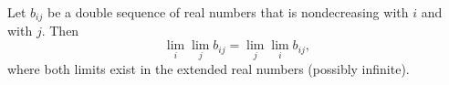 Let $b_{ij}$ be a double sequence of real numbers that is nondecreasing with $i$ and with $j$. Then
$$\lim_i \lim_j b_{ij} = \lim_j \lim_i b_{ij},$$
where both limits exist in the extended real numbers (possibly infinite).
